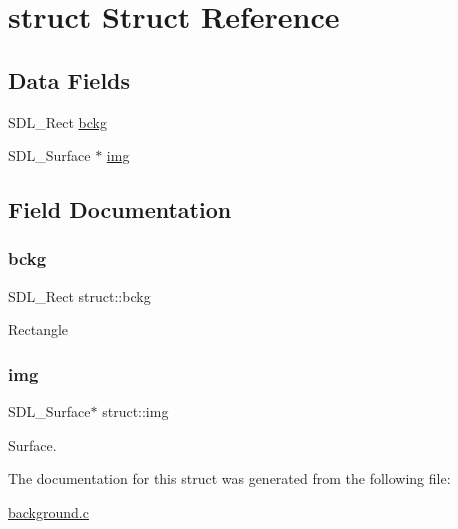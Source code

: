 \hypertarget{structstruct}{}\section{struct Struct Reference}
\label{structstruct}
\subsection*{Data Fields}
\begin{DoxyCompactItemize}
\item 
S\+D\+L\+\_\+\+Rect \hyperlink{structstruct_ae9204d3a9d77822904587eead462d3d7}{bckg}
\item 
S\+D\+L\+\_\+\+Surface $\ast$ \hyperlink{structstruct_aad913a38842894d7198d55dcbbafe085}{img}
\end{DoxyCompactItemize}


\subsection{Field Documentation}
\mbox{\label{structstruct_ae9204d3a9d77822904587eead462d3d7}} 
\subsubsection{\texorpdfstring{bckg}{bckg}}
{\footnotesize\ttfamily S\+D\+L\+\_\+\+Rect struct\+::bckg}

Rectangle \mbox{\label{structstruct_aad913a38842894d7198d55dcbbafe085}} 
\subsubsection{\texorpdfstring{img}{img}}
{\footnotesize\ttfamily S\+D\+L\+\_\+\+Surface$\ast$ struct\+::img}

Surface. 

The documentation for this struct was generated from the following file\+:\begin{DoxyCompactItemize}
\item 
\hyperlink{background_8c}{background.\+c}\end{DoxyCompactItemize}
